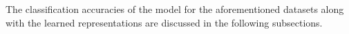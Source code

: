 The classification accuracies of the model for the aforementioned datasets along with the learned representations are discussed in the following subsections.

